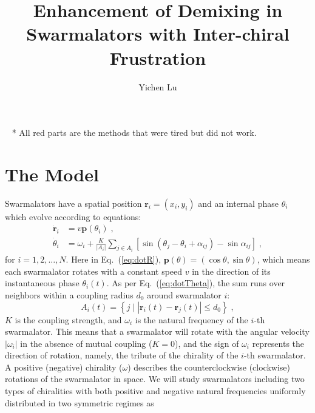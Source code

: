 \documentclass{article}
\title{\textbf{Enhancement of Demixing in Swarmalators with Inter-chiral Frustration}}
\author{Yichen Lu}
\begin{document}
\maketitle

\tableofcontents

\ \newline
\color{red}
    * All red parts are the methods that were tired but did not work.
\color{black}

\section{\label{sec:model}The Model}

Swarmalators have a spatial position $\mathbf{r}_i=\left( x_i, y_i \right)$ and an internal phase $\theta_i$ which evolve according to equations:
\begin{subequations} 
    \label{eq:totalDynamicsMeanField}
    \begin{align}
        \dot{\mathbf{r}}_i&=v\mathbf{p}\left( \theta _i \right)\;\label{eq:dotR},
        \\
        \dot{\theta}_i&=\omega _i+\frac{K}{\left| A_i \right|}\sum_{j\in A_i}{\left[ \sin \left( \theta _j-\theta _i+\alpha _{ij} \right) -\sin \alpha _{ij} \right]}\;\label{eq:dotTheta},
    \end{align}
\end{subequations}
for $i=1,2,\ldots,N$. Here in Eq.~(\ref{eq:dotR}), $\mathbf{p}\left( \theta \right) =\left( \cos \theta ,\sin \theta \right)$, which means each swarmalator rotates with a constant speed $v$ in the direction of its instantaneous phase $\theta_i (t)$. As per Eq.~(\ref{eq:dotTheta}), the sum runs over neighbors within a coupling radius $d_0$ around swarmalator $i$:
\begin{equation}
    A_i\left( t \right) =\left\{ j\mid \left| \mathbf{r}_i\left( t \right) -\mathbf{r}_j\left( t \right) \right|\leqslant d_0 \right\} \;,
\end{equation}
$K$ is the coupling strength, and $\omega_i$ is the natural frequency of the $i$-th swarmalator. 
This means that a swarmalator will rotate with the angular velocity $|\omega_i |$ in the absence of mutual coupling ($K=0$), and the sign of $\omega_i$ represents the direction of rotation, namely, the tribute of the chirality of the $i$-th swarmalator. A positive (negative) chirality ($\omega$) describes the counterclockwise (clockwise) rotations of the swarmalator in space. 
We will study swarmalators including two types of chiralities with both positive and negative natural frequencies uniformly distributed in two symmetric regimes as 
\end{document}
